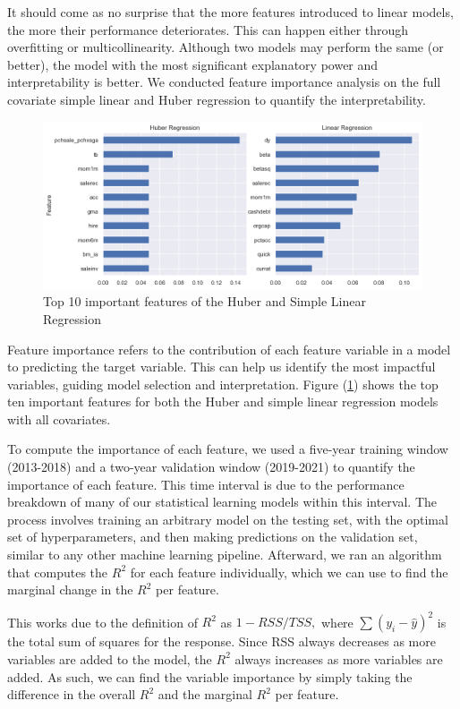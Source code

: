 It should come as no surprise that the more features introduced to linear models, the more their performance deteriorates. This can happen either through overfitting or multicollinearity. Although two models may perform the same (or better), the model with the most significant explanatory power and interpretability is better. We conducted feature importance analysis on the full covariate simple linear and Huber regression to quantify the interpretability.
\begin{figure}[h]\label{fig:feature_simple}
	\centering
	\includegraphics[width=17cm]{content/images/feature_simple}
	\caption{Top 10 important features of the Huber and Simple Linear Regression}
\end{figure}
Feature importance refers to the contribution of each feature variable in a model to predicting the target variable. This can help us identify the most impactful variables, guiding model selection and interpretation. Figure (\ref{fig:feature_simple}) shows the top ten important features for both the Huber and simple linear regression models with all covariates. 

To compute the importance of each feature, we used a five-year training window (2013-2018) and a two-year validation window (2019-2021) to quantify the importance of each feature. This time interval is due to the performance breakdown of many of our statistical learning models within this interval. The process involves training an arbitrary model on the testing set, with the optimal set of hyperparameters, and then making predictions on the validation set, similar to any other machine learning pipeline. Afterward, we ran an algorithm that computes the $R^2$ for each feature individually, which we can use to find the marginal change in the $R^2$ per feature.

This works due to the definition of $R^2$ as $1-RSS/TSS,$ where $\sum\left(y_i-\hat{y}\right)^2$ is the total sum of squares for the response. Since RSS always decreases as more variables are added to the model, the $R^2$ always increases as more variables are added. As such, we can find the variable importance by simply taking the difference in the overall $R^2$ and the marginal $R^2$ per feature.

